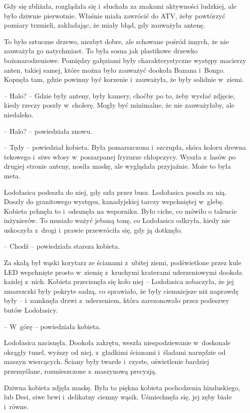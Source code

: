 \documentclass[oneside,polish,11pt,sfheadings]{mwbk}
\begin{document}
Gdy się zbliżała, rozglądała się i~słuchała za znakami aktywności
ludzkiej, ale było dziwnie pierwotnie. Właśnie miała zawrócić do ATV,
żeby powtórzyć pomiary trzmieli, zakładając, że miały błąd, gdy
zauważyła antenę.

To było sztuczne drzewo, niezbyt dobre, ale schowane pośród innych, że
nie zauważyła go natychmiast. To była sosna jak plastikowe drzewko
bożonarodzeniowe. Pomiędzy gałęziami były charakterystyczne występy
macierzy anten, takiej samej, które można było zauważyć dookoła Banana i~Bongo. Kopnęła tam, gdzie powinny być korzenie i~zauważyła, że były
solidnie w~ziemi.

-- Halo? -- Gdzie były anteny, były kamery, choćby po to, żeby wysłać
zdjęcie, kiedy rzeczy poszły w~cholerę. Mogły być minimalne, że nie
zauważyłaby, ale niedaleko. 

-- Halo? -- powiedziała znowu.

-- Tędy -- powiedział kobieta. Była pomarszczona i~szczupła, skóra koloru
drewna tekowego i~siwe włosy w~poszarpanej fryzurze chłopczycy. Wyszła z~lasów po drugiej stronie anteny, nosiła maskę, ale wyglądała przyjaźnie.
Może to była meta.

Lodołasica podeszła do niej, gdy szła przez busz. Lodołasica poszła za
nią. Doszły do granitowego występu, kanadyjskiej tarczy wepchniętej w~glebę. Kobieta pchnęła to i~odsunęła na wsporniku. Było ciche, co mówiło
o talencie inżynierów. To musiało ważyć jebaną tonę, co Lodołasica
odkryła, kiedy nie uskoczyła z~drogi i~prawie przewróciła się, gdy ją
dotknęło.

-- Chodź -- powiedziała starsza kobieta. 

Za skałą był wąski korytarz ze
ścianami z~ubitej ziemi, podświetlone przez kule LED wepchnięte prosto w~ziemię z~kruchymi kraterami uderzeniowymi dookoła każdej z~nich. Kobieta
przecisnęła się koło niej -- Lodołasica zobaczyła, że jej zmarszczki były
pokryte sadzą, co sprawiało, że były ciemniejsze niż naprawdę były -- i~zamknęła drzwi z~uderzeniem, która zarezonowało przez podeszwy butów
Lodołasicy.

-- W~górę -- powiedziała kobieta. 

Lodołasica nacisnęła. Dookoła zakrętu,
weszła niespodziewanie w~doskonale okrągły tunel, wyższy od niej, z~gładkimi ścianami i~śladami narzędzie od maszyn wiercących. Ściany były
twarde i~czyste, oświetlenie bardziej przemyślane, rozmieszczone z~maszynową precyzją.

Dziwna kobieta zdjęła maskę. Była to piękna kobieta pochodzenia
hinduskiego, lub Desi, siwe brwi i~delikatny ciemny wąsik. Uśmiechnęła
się, jej zęby białe i~równe. 
\end{document}
